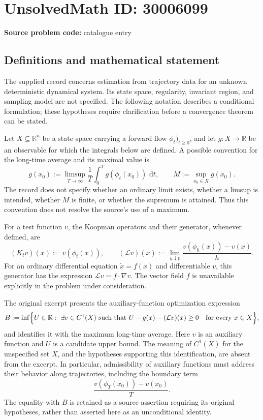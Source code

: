 \documentclass[11pt]{article}
\newcommand{\R}{\mathbb{R}}
\newcommand{\dd}{\,\mathrm{d}}
\begin{document}
\section*{UnsolvedMath ID: 30006099}
\textbf{Source problem code:} catalogue entry
\subsection{Definitions and mathematical statement}
The supplied record concerns estimation from trajectory data for an unknown deterministic dynamical system. Its state space, regularity, invariant region, and sampling model are not specified. The following notation describes a conditional formulation; these hypotheses require clarification before a convergence theorem can be stated.

Let \(X\subseteq\R^n\) be a state space carrying a forward flow \(\phi_t)_{t\geq0}\), and let \(g:X\to\R\) be an observable for which the integrals below are defined. A possible convention for the long-time average and its maximal value is
\[
\overline g(x_0):=\limsup_{T\to\infty}\frac1T\int_0^T g(\phi_t(x_0))\,\dd t,
\qquad
M:=\sup_{x_0\in X}\overline g(x_0).
\]
The record does not specify whether an ordinary limit exists, whether a limsup is intended, whether \(M\) is finite, or whether the supremum is attained. Thus this convention does not resolve the source's use of a maximum.

For a test function \(v\), the Koopman operators and their generator, whenever defined, are
\[
(K_t v)(x):=v(\phi_t(x)),
\qquad
(\mathcal L v)(x):=\lim_{h\downarrow0}\frac{v(\phi_h(x))-v(x)}{h}.
\]
For an ordinary differential equation \(\dot x=f(x)\) and differentiable \(v\), this generator has the expression \(\mathcal L v=f\cdot\nabla v\). The vector field \(f\) is unavailable explicitly in the problem under consideration.

The original excerpt presents the auxiliary-function optimization expression
\[
B:=\inf\Bigl\{U\in\R:\ \exists v\in C^1(X)\ \text{such that}\ 
U-g(x)-(\mathcal L v)(x)\geq0\quad\text{for every }x\in X\Bigr\},
\]
and identifies it with the maximum long-time average. Here \(v\) is an auxiliary function and \(U\) is a candidate upper bound. The meaning of \(C^1(X)\) for the unspecified set \(X\), and the hypotheses supporting this identification, are absent from the excerpt. In particular, admissibility of auxiliary functions must address their behavior along trajectories, including the boundary term
\[
\frac{v(\phi_T(x_0))-v(x_0)}{T}.
\]
The equality with \(B\) is retained as a source assertion requiring its original hypotheses, rather than asserted here as an unconditional identity.
\end{document}
